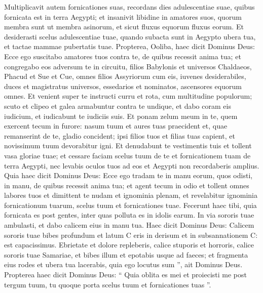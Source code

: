 \begin{biblechapter}
\begin{biblechapter}
\begin{biblechapter}
\begin{biblechapter}
\begin{biblechapter}
\begin{biblechapter}
\begin{biblechapter}
\begin{biblechapter}
\begin{biblechapter}
\begin{biblechapter}
\begin{biblechapter}
\begin{biblechapter}
\begin{biblechapter}
\begin{biblechapter}
\begin{biblechapter}
\begin{biblechapter}
\begin{biblechapter}
\begin{biblechapter}
\begin{biblechapter}
\begin{biblechapter}
\begin{biblechapter}
\begin{biblechapter}
\begin{biblechapter}
\verse Multiplicavit autem fornicationes suas, recordans dies adulescentiae suae, quibus fornicata est in terra Aegypti; 
\verse et insanivit libidine in amatores suos, quorum membra sunt ut membra asinorum, et sicut fluxus equorum fluxus eorum. 
\verse Et desiderasti scelus adulescentiae tuae, quando subacta sunt in Aegypto ubera tua, et tactae mammae pubertatis tuae.
 \verse Propterea, Ooliba, haec dicit Dominus Deus: Ecce ego suscitabo amatores tuos contra te, de quibus recessit anima tua; et congregabo eos adversum te in circuitu, 
\verse filios Babylonis et universos Chaldaeos, Phacud et Sue et Cue, omnes filios Assyriorum cum eis, iuvenes desiderabiles, duces et magistratus universos, essedarios et nominatos, ascensores equorum omnes. 
\verse Et venient super te instructi curru et rota, cum multitudine populorum; scuto et clipeo et galea armabuntur contra te undique, et dabo coram eis iudicium, et iudicabunt te iudiciis suis. 
\verse Et ponam zelum meum in te, quem exercent tecum in furore: nasum tuum et aures tuas praecident et, quae remanserint de te, gladio concident; ipsi filios tuos et filias tuas capient, et novissimum tuum devorabitur igni. 
\verse Et denudabunt te vestimentis tuis et tollent vasa gloriae tuae; 
\verse et cessare faciam scelus tuum de te et fornicationem tuam de terra Aegypti, nec levabis oculos tuos ad eos et Aegypti non recordaberis amplius. 
\verse Quia haec dicit Dominus Deus: Ecce ego tradam te in manu eorum, quos odisti, in manu, de quibus recessit anima tua; 
\verse et agent tecum in odio et tollent omnes labores tuos et dimittent te nudam et ignominia plenam, et revelabitur ignominia fornicationum tuarum, scelus tuum et fornicationes tuae. 
 \verse Fecerunt haec tibi, quia fornicata es post gentes, inter quas polluta es in idolis earum. 
\verse In via sororis tuae ambulasti, et dabo calicem eius in manu tua.
 \verse Haec dicit Dominus Deus:
 Calicem sororis tuae bibes
 profundum et latum
 C eris in derisum et in subsannationem C:
 est capacissimus.
 \verse Ebrietate et dolore repleberis,
 calice stuporis et horroris,
 calice sororis tuae Samariae,
 \verse et bibes illum et epotabis usque ad faeces;
 et fragmenta eius rodes
 et ubera tua lacerabis,
 quia ego locutus sum ”,
 ait Dominus Deus.
 \verse Propterea haec dicit Dominus Deus: “ Quia oblita es mei et proiecisti me post tergum tuum, tu quoque porta scelus tuum et fornicationes tuas ”. 

\end{biblechapter}
\end{biblechapter}
\end{biblechapter}
\end{biblechapter}
\end{biblechapter}
\end{biblechapter}
\end{biblechapter}
\end{biblechapter}
\end{biblechapter}
\end{biblechapter}
\end{biblechapter}
\end{biblechapter}
\end{biblechapter}
\end{biblechapter}
\end{biblechapter}
\end{biblechapter}
\end{biblechapter}
\end{biblechapter}
\end{biblechapter}
\end{biblechapter}
\end{biblechapter}
\end{biblechapter}
\end{biblechapter}
